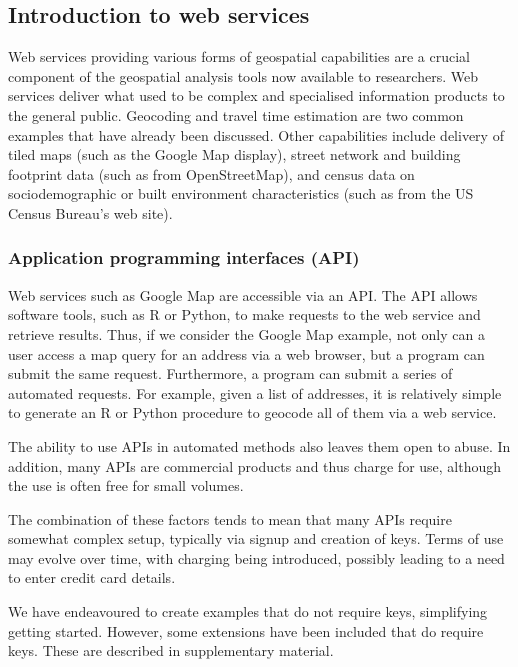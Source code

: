 \documentclass[utf8]{frontiersHLTH}
\begin{document}
\hypertarget{introduction-to-web-services}{%
\subsection{Introduction to web
services}\label{introduction-to-web-services}}

Web services providing various forms of geospatial capabilities are a
crucial component of the geospatial analysis tools now available to
researchers. Web services deliver what used to be complex and
specialised information products to the general public. Geocoding and
travel time estimation are two common examples that have already been
discussed. Other capabilities include delivery of tiled maps (such as
the Google Map display), street network and building footprint data
(such as from OpenStreetMap), and census data on sociodemographic or
built environment characteristics (such as from the US Census Bureau's
web site).

\subsubsection{Application programming interfaces
(API)}\label{application-programming-interfaces-api}

Web services such as Google Map are accessible via an API. The API allows software tools,
such as R or Python, to make requests to the web service and retrieve
results. Thus, if we consider the Google Map example, not only can a
user access a map query for an address via a web browser, but a program
can submit the same request. Furthermore, a program can submit a series
of automated requests. For example, given a list of addresses, it is
relatively simple to generate an R or Python procedure to geocode all of
them via a web service.

The ability to use APIs in automated methods also leaves them open to
abuse. In addition, many APIs are commercial products and thus charge
for use, although the use is often free for small volumes.

The combination of these factors tends to mean that many APIs require
somewhat complex setup, typically via signup and creation of keys. Terms
of use may evolve over time, with charging being introduced, possibly
leading to a need to enter credit card details.

We have endeavoured to create examples that do not require keys,
simplifying getting started. However, some extensions have been included
that do require keys. These are described in supplementary material.
\end{document}
